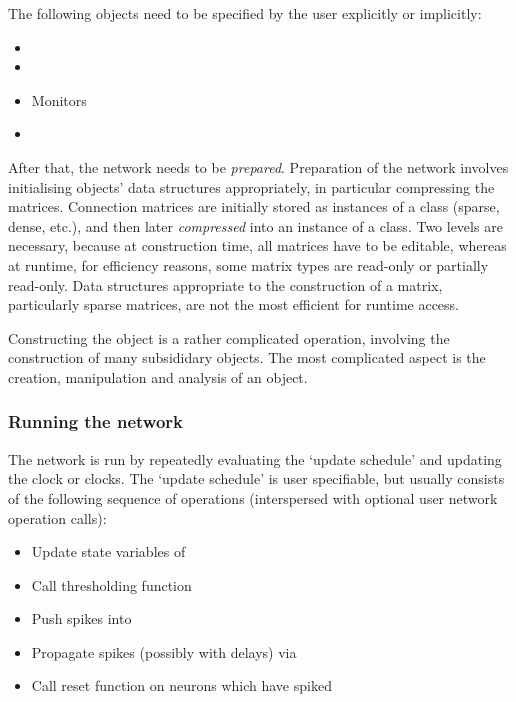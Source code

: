 \documentclass[letterpaper,10pt,english]{manual}
\begin{document}
The following objects need to be specified by the user explicitly or implicitly:
\begin{itemize}
\item {} 

\item {} 

\item {} 
Monitors

\item {} 

\end{itemize}

After that, the network needs to be \emph{prepared}. Preparation of the network
involves initialising objects' data structures appropriately, in particular
compressing the  matrices. Connection matrices are initially
stored as instances of a  class (sparse, dense, etc.),
and then later \emph{compressed} into an instance of a 
class. Two levels are necessary, because at construction time, all matrices have
to be editable, whereas at runtime, for efficiency reasons, some matrix types
are read-only or partially read-only. Data structures appropriate to the
construction of a matrix, particularly sparse matrices, are not the most
efficient for runtime access.

Constructing the  object is a rather complicated operation,
involving the construction of many subsididary objects. The most complicated
aspect is the creation, manipulation and analysis of an 
object.


\subsubsection{Running the network}

The network is run by repeatedly evaluating the `update schedule' and updating
the clock or clocks. The `update schedule' is user specifiable, but usually
consists of the following sequence of operations (interspersed with optional
user network operation calls):
\begin{itemize}
\item {} 
Update state variables of 

\item {} 
Call thresholding function

\item {} 
Push spikes into 

\item {} 
Propagate spikes (possibly with delays) via 

\item {} 
Call reset function on neurons which have spiked

\end{itemize}
\end{document}
